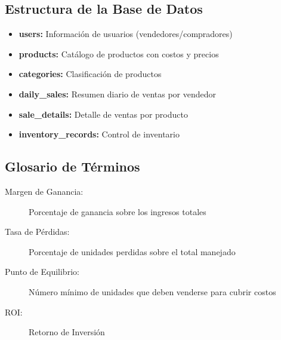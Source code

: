 \documentclass[12pt,a4paper]{article}
\begin{document}
\subsection{Estructura de la Base de Datos}
\begin{itemize}
    \item \textbf{users:} Información de usuarios (vendedores/compradores)
    \item \textbf{products:} Catálogo de productos con costos y precios
    \item \textbf{categories:} Clasificación de productos
    \item \textbf{daily\_sales:} Resumen diario de ventas por vendedor
    \item \textbf{sale\_details:} Detalle de ventas por producto
    \item \textbf{inventory\_records:} Control de inventario
\end{itemize}

\subsection{Glosario de Términos}
\begin{description}
    \item[Margen de Ganancia:] Porcentaje de ganancia sobre los ingresos totales
    \item[Tasa de Pérdidas:] Porcentaje de unidades perdidas sobre el total manejado
    \item[Punto de Equilibrio:] Número mínimo de unidades que deben venderse para cubrir costos
    \item[ROI:] Retorno de Inversión
\end{description}
\end{document}
